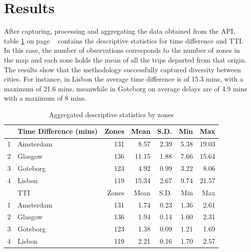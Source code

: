 \documentclass[a4paper]{jpconf}
\begin{document}
\section{Results}
After capturing, processing and aggregating the data obtained from the API, table \ref{tab:Results_grids} on page ~\pageref{tab:Results_grids} contains the descriptive statistics for time difference and TTI. In this case, the number of observations corresponds to the number of zones in the map and each zone holds the mean of all the trips departed from that origin. 
\indent The results show that the methodology successfully captured diversity between cities. For instance, in Lisbon the average time difference is of 15.3 mins, with a maximum of 21.6 mins, meanwhile in Goteborg on average delays are of 4.9 mins with a maximum of 8 mins.  

\begin{table}[ht]		
	\centering
	\begin{tabular}{rlrrrrr}
		\hline
		  & Time Difference (mins) & Zones & Mean & S.D. & Min & Max \\ 
		\hline
		1 & Amsterdam 	& 131 	& 8.57  & 2.39 & 5.38 & 19.03 \\ 
		2 & Glasgow 	& 136 	& 11.15 & 1.88 & 7.66 & 15.64 \\ 
		3 & Goteborg 	& 123 	& 4.92  & 0.99 & 3.22 & 8.06  \\ 
		4 & Lisbon 		& 119 	& 15.34 & 2.67 & 9.74 & 21.57 \\ 
		
		\hline
		  & TTI	& Zones & Mean & S.D. & Min & Max \\ 
		\hline
		1 & Amsterdam 	& 131 & 1.74 & 0.23 & 1.36 & 2.61 \\ 
		2 & Glasgow 	& 136 & 1.94 & 0.14 & 1.60 & 2.31 \\ 
		3 & Goteborg	& 123 & 1.38 & 0.09 & 1.21 & 1.69 \\ 
		4 & Lisbon 		& 119 & 2.21 & 0.16 & 1.70 & 2.57 \\ 
		\hline
	\end{tabular}
	\caption {Aggregated descriptive statistics by zones}
	\label{tab:Results_grids}
\end{table}
\end{document}
